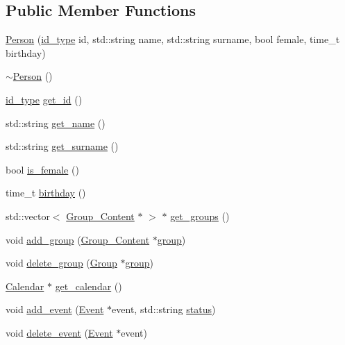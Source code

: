 \subsection*{Public Member Functions}
\begin{DoxyCompactItemize}
\item 
\hyperlink{classPerson_a1b0a164e39923dc6a7bd37a075dceda7}{Person} (\hyperlink{types_8h_a0b60c08a3ab1435cccc5643d32d8ccee}{id\_\-type} id, std::string name, std::string surname, bool female, time\_\-t birthday)
\item 
\hyperlink{classPerson_a700ffd693321c5fe6880262acf43d4da}{$\sim$Person} ()
\item 
\hyperlink{types_8h_a0b60c08a3ab1435cccc5643d32d8ccee}{id\_\-type} \hyperlink{classPerson_addbe4758044124636fb0f9d3094c6fcb}{get\_\-id} ()
\item 
std::string \hyperlink{classPerson_a1837ca2f4ba804aeee2a70c1a1fdd468}{get\_\-name} ()
\item 
std::string \hyperlink{classPerson_aad33f79ec5c96aa3ab30c9c4c989fb4b}{get\_\-surname} ()
\item 
bool \hyperlink{classPerson_a8bfe5b0c264f051b85812c692691e277}{is\_\-female} ()
\item 
time\_\-t \hyperlink{classPerson_aec14dd73ca58227cc70c4ba3a5065d02}{birthday} ()
\item 
std::vector$<$ \hyperlink{structGroup__Content}{Group\_\-Content} $\ast$ $>$ $\ast$ \hyperlink{classPerson_a24cd3ad56c42c1cd34505b1094e6e7d5}{get\_\-groups} ()
\item 
void \hyperlink{classPerson_aa17159e6bb16f2a42a1c4bcae08ae903}{add\_\-group} (\hyperlink{structGroup__Content}{Group\_\-Content} $\ast$\hyperlink{group__content_8h_a27517aa1480ab2d9bfe5d62e693b33eb}{group})
\item 
void \hyperlink{classPerson_a93dfe7e17e0316b1f7dddebf5fd3f7ce}{delete\_\-group} (\hyperlink{classGroup}{Group} $\ast$\hyperlink{group__content_8h_a27517aa1480ab2d9bfe5d62e693b33eb}{group})
\item 
\hyperlink{classCalendar}{Calendar} $\ast$ \hyperlink{classPerson_abaaac95db5394d3ad78ad08221b1d231}{get\_\-calendar} ()
\item 
void \hyperlink{classPerson_a57689e959d613756a806e5d32654d3e8}{add\_\-event} (\hyperlink{classEvent}{Event} $\ast$event, std::string \hyperlink{group__content_8h_ab4d38e7365d935f2a5f1403eec29127e}{status})
\item 
void \hyperlink{classPerson_ab788997b3b66a72e51f924d416029ff5}{delete\_\-event} (\hyperlink{classEvent}{Event} $\ast$event)
\end{DoxyCompactItemize}


